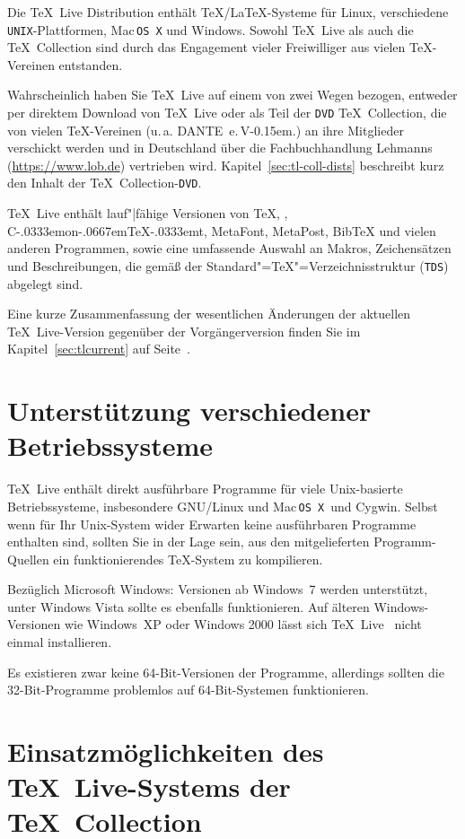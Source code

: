 \documentclass[12pt,ngerman,a4paper,fullparskip]{report}
\newcommand{\TL}{\TeX\ Live\xspace}
\newcommand{\acro}[1]{\texttt{#1}}
\def\TK{\TeX\ Collection}
\newcommand\ConTeXt{C\kern-.0333emon\-\kern-.0667em\TeX\kern-.0333emt}
\def\MP{MetaPost}
\def\MF{MetaFont}
\def\BibTeX{Bib\TeX}
\providecommand*{\DVD}{\acro{DVD}\xspace}
\providecommand*{\MacOSX}{Mac\,\acro{OS\,X}\xspace}
\providecommand*{\TDS}{\acro{TDS}\xspace}
\newcommand{\dante}{DANTE~e.\,V\kern-0.15em.}
\begin{document}
Die {\TL} Distribution enthält \TeX/\LaTeX-Systeme für Linux, verschiedene \acro{UNIX}-Plattformen, {\MacOSX} und Windows. Sowohl \TL{} als auch die \TK{} sind durch das Engagement vieler Freiwilliger aus vielen \TeX-Vereinen  entstanden. 

Wahrscheinlich haben Sie \TL{} auf einem von zwei Wegen bezogen, entweder per direktem Download von \TL{} oder als Teil der \DVD{} \TK, die von vielen \TeX-Vereinen (u.\,a. \dante) an ihre Mitglieder verschickt werden und in Deutschland über die Fachbuchhandlung Lehmanns (\url{https://www.lob.de})
vertrieben wird. Kapitel~\ref{sec:tl-coll-dists} beschreibt kurz den Inhalt der \TK-\DVD. 



{\TL} enthält lauf"|fähige Versionen von \TeX, \LaTeXe, \ConTeXt, \MF, \MP, {\BibTeX}  und vielen anderen Programmen, sowie eine umfassende Auswahl an Makros, Zeichensätzen und Beschreibungen, die gemäß der Standard"=\TeX"=Verzeichnisstruktur (\TDS) abgelegt sind.

Eine kurze Zusammenfassung der wesentlichen Änderungen der aktuellen \TL-Version gegenüber der Vorgängerversion finden Sie im Kapitel~\ref{sec:tlcurrent} auf Seite~\pageref{sec:tlcurrent}.

\section{Unterstützung verschiedener Betriebssysteme}\label{sec:os-support}

\TL{} enthält direkt ausführbare Programme für viele Unix-basierte Betriebssysteme, insbesondere GNU/Linux und \MacOSX\ und Cygwin. Selbst wenn für Ihr Unix-System wider Erwarten keine ausführbaren Programme enthalten sind, sollten Sie in der Lage sein, aus den mitgelieferten Programm-Quellen ein funktionierendes \TeX-System zu kompilieren.

Bezüglich Microsoft Windows: Versionen ab Windows~7 werden unterstützt, unter Windows Vista sollte es ebenfalls funktionieren. Auf älteren Windows-Versionen wie Windows~XP oder Windows 2000 lässt sich \TL~ nicht einmal installieren.

Es existieren zwar keine  64-Bit-Ver\-sionen der Programme, allerdings sollten die 32-Bit-Programme problemlos auf 64-Bit-Systemen funktionieren.

\section{Einsatzmöglichkeiten des \TL-Systems der \TeX\ Collection}\label{sec:basic}
\end{document}
